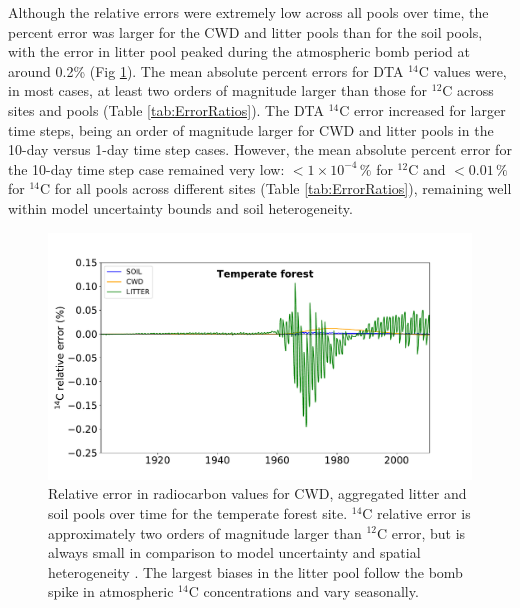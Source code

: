 \documentclass[11pt,a4paper]{article}
\begin{document}
    

Although the relative errors were extremely low across all pools over time, the percent error was larger for the CWD and litter pools than for the soil pools, with the error in litter pool peaked during the atmospheric bomb period at around 0.2\% (Fig \ref{fig:10dayErrorOverTime}). The mean absolute percent errors for DTA $^{14}$C values were, in most cases, at least two orders of magnitude larger than those for $^{12}$C across sites and pools (Table \ref{tab:ErrorRatios}). The DTA $^{14}$C error increased for larger time steps, being an order of magnitude larger for CWD and litter pools in the 10-day versus 1-day time step cases. However, the mean absolute percent error for the 10-day time step case remained very low: $< 1 \times 10^{-4}\,\%$ for $^{12}$C and $<0.01\,\%$ for $^{14}$C for all pools across different sites (Table \ref{tab:ErrorRatios}), remaining well within model uncertainty bounds and soil heterogeneity.

\begin{figure}[htbp]
        \centering 
        \includegraphics[width=1.0\linewidth]{figs/C14_through_time_rel_err_10.pdf}
        \caption{Relative error in radiocarbon values for CWD, aggregated litter and soil pools over time for the temperate forest site. $^{14}$C relative error is approximately two orders of magnitude larger than $^{12}$C error, but is always small in comparison to model uncertainty and spatial heterogeneity \citep{Chen2009JGR}. The largest biases in the litter pool follow the bomb spike in atmospheric $^{14}$C concentrations and vary seasonally.}
        \label{fig:10dayErrorOverTime}
\end{figure}    
\end{document}
